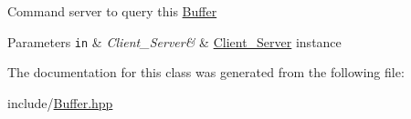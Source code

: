 Command server to query this \hyperlink{classColliderPlusPlus_1_1Buffer}{Buffer} 
\begin{DoxyParams}[1]{Parameters}
\mbox{\tt in}  & {\em Client\-\_\-\-Server\&} & \hyperlink{classColliderPlusPlus_1_1Client__Server}{Client\-\_\-\-Server} instance \\
\hline
\end{DoxyParams}


The documentation for this class was generated from the following file\-:\begin{DoxyCompactItemize}
\item 
include/\hyperlink{Buffer_8hpp}{Buffer.\-hpp}\end{DoxyCompactItemize}
